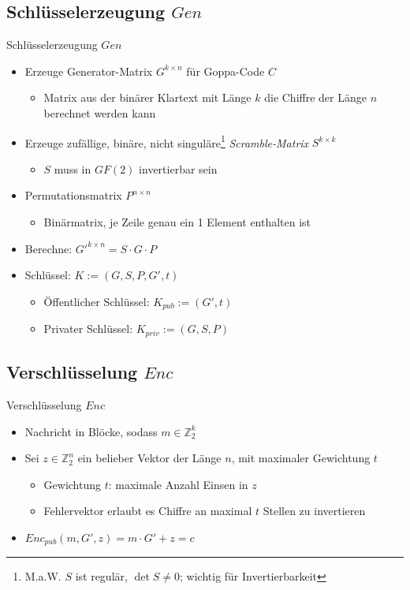 \documentclass[11pt%
,aspectratio=169%
]{beamer}
\begin{document}
\subsection{Schlüsselerzeugung $Gen$}
\begin{frame}{Schlüsselerzeugung $Gen$}
\begin{itemize}
    \item Erzeuge Generator-Matrix $G^{k \times n}$  für Goppa-Code $C$
    \begin{itemize}
        \item Matrix aus der binärer Klartext mit Länge $k$ die Chiffre der Länge $n$ berechnet werden kann
    \end{itemize}
    \item Erzeuge zufällige, binäre, nicht singuläre\footnote{M.a.W. $S$ ist regulär, $\det S \neq 0$; wichtig für Invertierbarkeit} \emph{Scramble-Matrix} $S^{k \times k}$
    \begin{itemize}
        \item $S$ muss in $GF(2)$ invertierbar sein
    \end{itemize}
    \item Permutationsmatrix $P^{n \times n}$
    \begin{itemize}
        \item Binärmatrix, je Zeile genau ein 1 Element enthalten ist
    \end{itemize}
    \item Berechne: $G'^{k \times n} = S \cdot G \cdot P$
    \item Schlüssel: $K := (G,S,P,G',t)$
    \begin{itemize}
        \item Öffentlicher Schlüssel: $K_{pub}:= (G', t)$
        \item Privater Schlüssel: $K_{priv} := (G,S,P)$
    \end{itemize}
\end{itemize}
\end{frame}

\subsection{Verschlüsselung $Enc$}
\begin{frame}{Verschlüsselung $Enc$}
    \begin{itemize}
        \item Nachricht in Blöcke, sodass $m \in \mathbb{Z}_2^k$
        \item Sei $z \in \mathbb{Z}_2^n$ ein belieber Vektor der Länge $n$, mit maximaler Gewichtung $t$
        \begin{itemize}
            \item Gewichtung $t$: maximale Anzahl Einsen in $z$
            \item Fehlervektor erlaubt es Chiffre an maximal $t$ Stellen zu invertieren
        \end{itemize}   
        \item $Enc_{pub}(m,G', z) = m \cdot G' + z = c$
    \end{itemize}
\end{frame}
    
\end{document}

